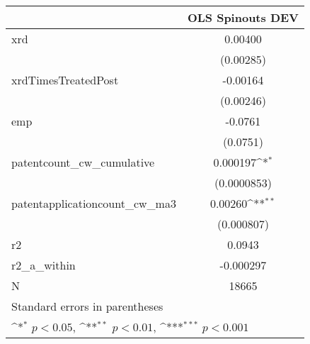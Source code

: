 {
\def\sym#1{\ifmmode^{#1}\else\(^{#1}\)\fi}
\begin{tabular}{l*{1}{c}}
\hline\hline
            &\multicolumn{1}{c}{OLS Spinouts DEV}\\
\hline
xrd         &     0.00400         \\
            &   (0.00285)         \\
[1em]
xrdTimesTreatedPost&    -0.00164         \\
            &   (0.00246)         \\
[1em]
emp         &     -0.0761         \\
            &    (0.0751)         \\
[1em]
patentcount\_cw\_cumulative&    0.000197\sym{*}  \\
            & (0.0000853)         \\
[1em]
patentapplicationcount\_cw\_ma3&     0.00260\sym{**} \\
            &  (0.000807)         \\
\hline
r2          &      0.0943         \\
r2\_a\_within &   -0.000297         \\
N           &       18665         \\
\hline\hline
\multicolumn{2}{l}{\footnotesize Standard errors in parentheses}\\
\multicolumn{2}{l}{\footnotesize \sym{*} \(p<0.05\), \sym{**} \(p<0.01\), \sym{***} \(p<0.001\)}\\
\end{tabular}
}
